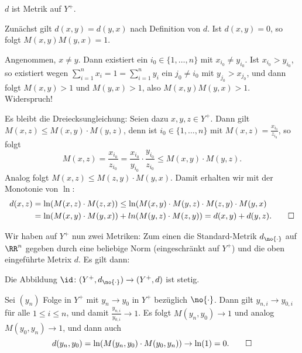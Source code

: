 \begin{lemma}
	\label{lemma:13.12}
	$d$ ist Metrik auf $Y^+$.
\end{lemma}

\begin{beweis}
	Zunächst gilt $d(x,y) = d(y,x)$ nach Definition von $d$.
	Ist $d(x,y) = 0$, so folgt $M(x,y)M(y,x) = 1$.
	
	Angenommen, $x \neq y$.
	Dann existiert ein $i_0 \in \{1,\dots,n\}$ mit $x_{i_0} \neq y_{i_0}$.
	Ist $x_{i_0} > y_{i_0}$, so existiert wegen $\sum_{i=1}^{n} x_i = 1 = \sum_{i=1}^{n} y_i$ ein $j_0 \neq i_0$ mit $y_{j_0} > x_{j_0}$, und dann folgt $M(x,y) > 1$ und $M(y,x) > 1$, also $M(x,y)M(y,x) > 1$.
	Widerspruch!
	
	Es bleibt die Dreiecksungleichung:
	Seien dazu $x,y,z \in Y^+$.
	Dann gilt $M(x,z) \leq M(x,y) \cdot M(y,z)$, denn ist $i_0 \in \{1,\dots,n\}$ mit $M(x,z) = \frac{x_{i_0}}{z_{i_0}}$, so folgt
	\[
		M(x,z) = \frac{x_{i_0}}{z_{i_0}} = \frac{x_{i_0}}{y_{i_0}} \cdot \frac{y_{i_0}}{z_{i_0}} \leq M(x,y) \cdot M(y,z).
	\]
	Analog folgt $M(x,z) \leq M(z,y) \cdot M(y,x)$.
	Damit erhalten wir mit der Monotonie von $\ln$:
	\begin{align*}
		d(x,z) &= \ln(M(x,z) \cdot M(z,x)) \leq \ln(M(x,y)\cdot M(y,z) \cdot M(z,y) \cdot M(y,x) \\
		&= \ln(M(x,y) \cdot M(y,x)) + ln(M(y,z) \cdot M(z,y)) = d(x,y) + d(y,z). \qedhere
	\end{align*}
\end{beweis}

Wir haben auf $Y^+$ nun zwei Metriken:
Zum einen die Standard-Metrik $d_{\no{\cdot}}$ auf $\RR^n$ gegeben durch eine beliebige Norm (eingeschränkt auf $Y^+$) und die oben eingeführte Metrix $d$.
Es gilt dann:
\newpage
\begin{lemma}
	\label{lemma:13.14}
	Die Abbildung $\id\colon (Y^+,d_{\no{\cdot}}) \rightarrow (Y^+,d)$ ist stetig.
\end{lemma}

\begin{beweis}
	Sei $(y_n)$ Folge in $Y^+$ mit $y_n \rightarrow y_0$ in $Y^+$ bezüglich $\no{\cdot}$.
	Dann gilt $y_{n,i} \rightarrow y_{0,i}$ für alle $1 \leq i \leq n$, und damit $\frac{y_{n,i}}{y_{0,i}} \rightarrow 1$.
	Es folgt $M(y_n,y_0) \rightarrow 1$ und analog $M(y_0,y_n) \rightarrow 1$, und dann auch
	\[
		d(y_n,y_0) = \ln(M(y_n,y_0) \cdot M(y_0,y_n)) \rightarrow \ln(1) = 0. \qedhere
	\]
\end{beweis}

